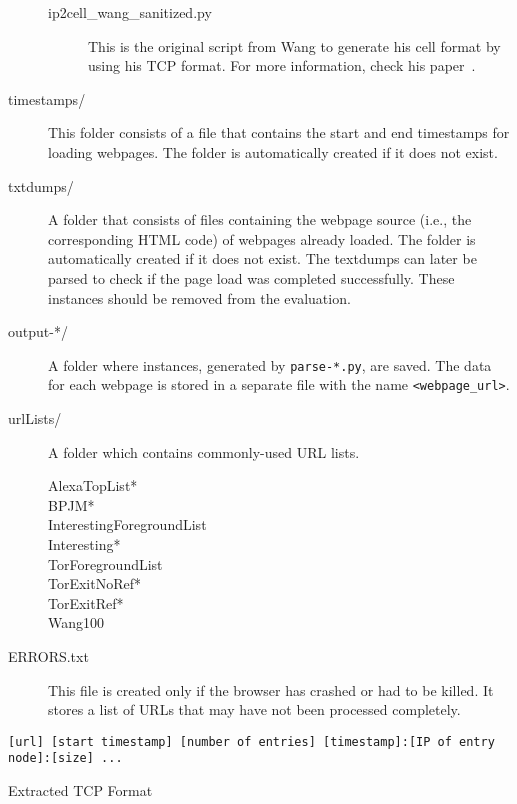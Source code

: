 \begin{description}
\begin{description}
\item[ip2cell\_wang\_sanitized.py] This is the original script from Wang to generate his cell format by using his \ac{TCP} format. For more information, check his paper~\cite{Wang2014}.
\end{description}
\item[timestamps/] This folder consists of a file that contains the start and end timestamps for loading webpages. The folder is automatically created if it does not exist. 
\item[txtdumps/] A folder that consists of files containing the webpage source (i.e., the corresponding \ac{HTML} code) of webpages already loaded. The folder is automatically created if it does not exist. The textdumps can later be parsed to check if the page load was completed successfully. These instances should be removed from the evaluation.
\item[output-*/] A folder where instances, generated by \texttt{parse-*.py}, are saved. The data for each webpage is stored in a separate file with the name \texttt{<webpage\_url>}.
\item[urlLists/] A folder which contains commonly-used \ac{URL} lists.
\begin{description}
\item[AlexaTopList*]
\item[BPJM*]
\item[InterestingForegroundList]
\item[Interesting*]
\item[TorForegroundList]
\item[TorExitNoRef*]
\item[TorExitRef*]
\item[Wang100]
\end{description}
\item[ERRORS.txt] This file is created only if the browser has crashed or had to be killed. It stores a list of \ac{URL}s that may have not been processed completely.
\end{description}

\begin{listing}[t]
\begin{lstlisting}[basicstyle=\scriptsize\ttfamily,numbers=none]
[url] [start timestamp] [number of entries] [timestamp]:[IP of entry node]:[size] ...
\end{lstlisting}
\caption{Extracted \ac{TCP} Format}
\label{lst:tcpextracteddata}
\end{listing}


